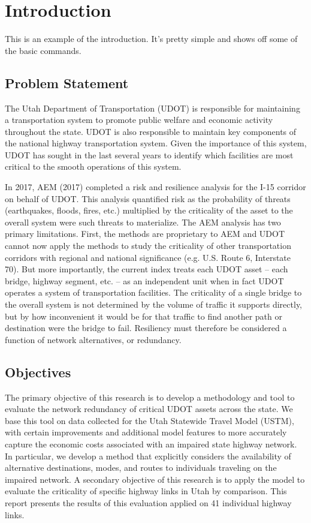 \chapter{Introduction}
\label{chp:chapter1}
\graphicspath{{figures/}{figures/chapter1/}}
This is an example of the introduction. It's pretty simple and shows off
some of the basic commands.

\section{Problem Statement}
The Utah Department of Transportation (UDOT) is responsible for maintaining a transportation
 system to promote public welfare and economic activity throughout the state. UDOT is also
 responsible to maintain key components of the national highway transportation system. Given the
 importance of this system, UDOT has sought in the last several years to identify which 
 facilities
 are most critical to the smooth operations of this system.
 
In 2017, AEM (2017) completed a risk and resilience analysis for the I-15 corridor on behalf of
UDOT. This analysis quantified risk as the probability of threats (earthquakes, floods, fires,
etc.) multiplied by the criticality of the asset to the overall system were such threats to
materialize. The AEM analysis has two primary limitations. First, the methods are proprietary to
AEM and UDOT cannot now apply the methods to study the criticality of other transportation
corridors with regional and national significance (e.g. U.S. Route 6, Interstate 70). But more
importantly, the current index treats each UDOT asset – each bridge, highway segment, etc. – as an
independent unit when in fact UDOT operates a system of transportation facilities. The criticality
of a single bridge to the overall system is not determined by the volume of traffic it supports 
directly, but by how inconvenient it would be for that traffic to find another path or destination
were the bridge to fail. Resiliency must therefore be considered a function of network
alternatives, or redundancy.

\section{Objectives}
The primary objective of this research is to develop a methodology and tool to evaluate the
network redundancy of critical UDOT assets across the state. We base this tool on data collected
for the Utah Statewide Travel Model (USTM), with certain improvements and additional model
features to more accurately capture the economic costs associated with an impaired state highway
network. In particular, we develop a method that explicitly considers the availability of 
alternative destinations, modes, and routes to individuals traveling on the impaired network. A
secondary objective of this research is to apply the model to evaluate the criticality of
specific
highway links in Utah by comparison. This report presents the results of this evaluation applied
on 41 individual highway links.

